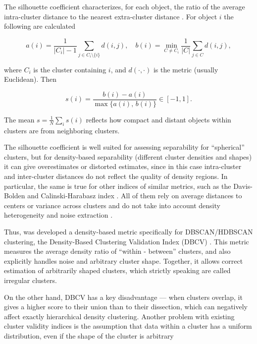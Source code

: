 The silhouette coefficient characterizes, for each object, the ratio of the average intra-cluster distance
to the nearest extra-cluster distance \parencite{silouette1987}. For object $i$ the following are calculated

\begin{equation}
    a(i)=\frac{1}{|C_i|-1}\sum_{j\in C_i\setminus\{i\}}d(i,j),\quad b(i)=\min_{C\neq C_i}\frac{1}{|C|}\sum_{j\in C}d(i,j),
\end{equation}

where $C_i$ is the cluster containing $i$, and $d(\cdot,\cdot)$ is the metric (usually Euclidean). Then

\begin{equation}
    s(i)=\frac{b(i)-a(i)}{\max\{a(i),\,b(i)\}}\in[-1,1].
\end{equation}

The mean $s=\frac1N\sum_i s(i)$ reflects how compact and distant objects within clusters are from neighboring
clusters.

The silhouette coefficient is well suited for assessing separability for “spherical” clusters, but
for density-based separability (different cluster densities and shapes) it can give overestimates or distorted
estimates, since in this case intra-cluster and inter-cluster distances do not reflect the quality of density
regions. In particular, the same is true for other indices of similar metrics, such as the Davis-Bolden and
Calinski-Harabasz index \parencite{mmj2023liu}. All of them rely on average distances to centers or variance across clusters
and do not take into account density heterogeneity and noise extraction \parencite{liu2024newindexclusteringevaluation}.

Thus, was developed a density-based metric specifically for DBSCAN/HDBSCAN clustering, the Density-Based Clustering Validation
Index (DBCV) \parencite{dbcv2014density}. This metric measures the average density ratio of “within - between” clusters,
and also explicitly handles noise and arbitrary cluster shape. Together, it allows correct estimation of arbitrarily shaped
clusters, which strictly speaking are called irregular clusters.

On the other hand, DBCV has a key disadvantage --- when clusters overlap, it gives a higher score to their union than to their
dissection, which can negatively affect exactly hierarchical density clustering. Another problem with existing cluster
validity indices is the assumption that data within a cluster has a uniform distribution, even if the shape of the cluster
is arbitrary

